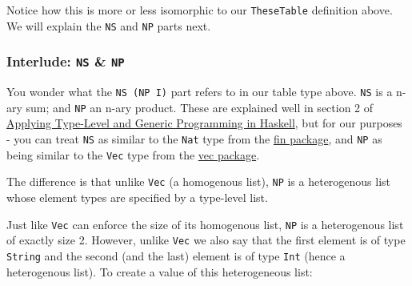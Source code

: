 Notice how this is more or less isomorphic to our \texttt{TheseTable}
definition above. We will explain the \texttt{NS} and \texttt{NP} parts
next.

\hypertarget{interlude-ns-np}{%
\subsubsection{\texorpdfstring{Interlude: \texttt{NS} \&
\texttt{NP}}{Interlude: NS \& NP}}\label{interlude-ns-np}}

You wonder what the \texttt{NS\ (NP\ I)} part refers to in our table
type above. \texttt{NS} is a n-ary sum; and \texttt{NP} an n-ary
product. These are explained well in section 2 of
\href{https://github.com/kosmikus/SSGEP/blob/master/LectureNotes.pdf}{Applying
Type-Level and Generic Programming in Haskell}, but for our purposes -
you can treat \texttt{NS} as similar to the \texttt{Nat} type from the
\href{https://hackage.haskell.org/package/fin-0.2.1/docs/Data-Nat.html}{fin
package}, and \texttt{NP} as being similar to the \texttt{Vec} type from
the
\href{https://hackage.haskell.org/package/vec-0.4.1/docs/Data-Vec-Lazy.html\#t:Vec}{vec
package}.

The difference is that unlike \texttt{Vec} (a homogenous list),
\texttt{NP} is a heterogenous list whose element types are specified by
a type-level list.

\begin{Shaded}
\begin{Highlighting}[]
\OperatorTok{\textgreater{}} \OperatorTok{:} \NormalTok{ \textquotesingle{}[}\NormalTok{, }\NormalTok{]}
 \NormalTok{ \textquotesingle{}[}\NormalTok{, }\NormalTok{]}\OtherTok{ ::} 
\end{Highlighting}
\end{Shaded}

Just like \texttt{Vec} can enforce the size of its homogenous list,
\texttt{NP} is a heterogenous list of exactly size 2. However, unlike
\texttt{Vec} we also say that the first element is of type
\texttt{String} and the second (and the last) element is of type
\texttt{Int} (hence a heterogenous list). To create a value of this
heterogeneous list:

\begin{Shaded}
\begin{Highlighting}[]
\OperatorTok{\textgreater{}}   \OperatorTok{:*}   \OperatorTok{:*} \OtherTok{  ::}  \NormalTok{ \textquotesingle{}[}\NormalTok{, }\NormalTok{]}
  \OperatorTok{:*}   \OperatorTok{:*} 
\end{Highlighting}
\end{Shaded}

